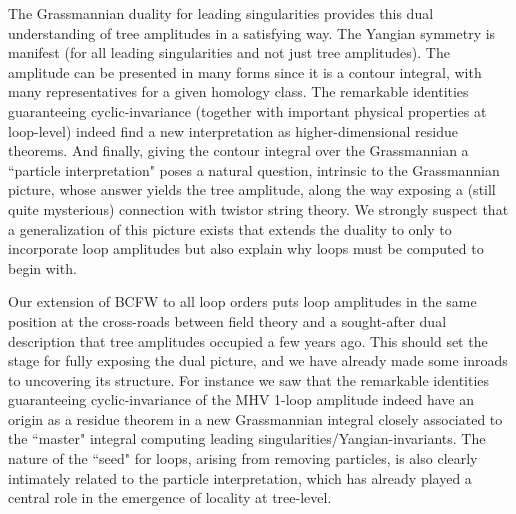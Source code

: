 \documentclass[11pt, reqno]{article}
\begin{document}

The Grassmannian duality for leading singularities provides this dual understanding of tree amplitudes in a satisfying way. The Yangian symmetry is manifest (for all leading singularities and not just tree amplitudes). The amplitude can be presented in many forms since it is a contour integral, with many representatives for a given homology class. The remarkable identities guaranteeing cyclic-invariance (together with important physical properties at loop-level) indeed find a new interpretation as higher-dimensional residue theorems. And finally, giving the contour integral over the Grassmannian a ``particle interpretation" poses a natural question, intrinsic to the Grassmannian picture, whose answer yields the tree amplitude, along the way exposing a (still quite mysterious) connection with twistor string theory.
We strongly suspect that a generalization of this picture exists that extends the duality to only to incorporate loop amplitudes but also explain why loops must be computed to begin with.

Our extension of BCFW to all loop orders puts loop amplitudes in the same position at the cross-roads between field theory and a sought-after dual description that tree amplitudes occupied a few years ago. This should set the stage for fully exposing the dual picture, and we have already made some inroads to uncovering its structure. For instance we saw that the remarkable identities guaranteeing cyclic-invariance of the MHV 1-loop amplitude indeed have an origin as a residue theorem in a new Grassmannian integral closely associated to the ``master" integral computing leading singularities/Yangian-invariants. The nature of the ``seed" for loops, arising from removing particles, is also clearly intimately related to the particle interpretation, which has already played a central role in the emergence of locality at tree-level.
\end{document}
